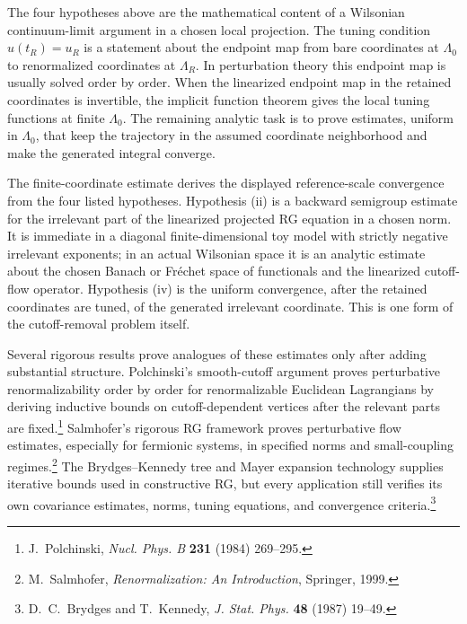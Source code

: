 The four hypotheses above are the mathematical content of a Wilsonian
continuum-limit argument in a chosen local projection.  The tuning condition
\(u(t_R)=u_R\) is a statement about the endpoint map from bare coordinates at
\(\Lambda_0\) to renormalized coordinates at \(\Lambda_R\).  In perturbation
theory this endpoint map is usually solved order by order.  When the
linearized endpoint map in the retained coordinates is invertible, the
implicit function theorem gives the local tuning functions at finite
\(\Lambda_0\).  The remaining analytic task is to prove estimates, uniform in
\(\Lambda_0\), that keep the trajectory in the assumed coordinate
neighborhood and make the generated integral converge.

\begin{remark}
The finite-coordinate estimate derives the displayed reference-scale
convergence from the four listed hypotheses.  Hypothesis (ii) is a backward
semigroup estimate for the irrelevant part of the linearized projected RG
equation in a chosen norm.  It is immediate in a diagonal finite-dimensional
toy model with strictly negative irrelevant exponents; in an actual Wilsonian
space it is an analytic estimate about the chosen Banach or Fr\'echet space
of functionals and the linearized cutoff-flow operator.  Hypothesis (iv) is
the uniform convergence, after the retained coordinates are tuned, of the
generated irrelevant coordinate.  This is one form of the cutoff-removal
problem itself.

Several rigorous results prove analogues of these estimates only after adding
substantial structure.  Polchinski's smooth-cutoff argument proves
perturbative renormalizability order by order for renormalizable Euclidean
Lagrangians by deriving inductive bounds on cutoff-dependent vertices after
the relevant parts are fixed.\footnote{J.~Polchinski, \emph{Nucl. Phys. B}
\textbf{231} (1984) 269--295.}  Salmhofer's rigorous RG framework proves
perturbative flow estimates, especially for fermionic systems, in specified
norms and small-coupling regimes.\footnote{M.~Salmhofer,
\emph{Renormalization: An Introduction}, Springer, 1999.}  The
Brydges--Kennedy tree and Mayer expansion technology supplies iterative bounds
used in constructive RG, but every application still verifies its own
covariance estimates, norms, tuning equations, and convergence
criteria.\footnote{D.~C.~Brydges and T.~Kennedy, \emph{J. Stat. Phys.}
\textbf{48} (1987) 19--49.}


\end{remark}
